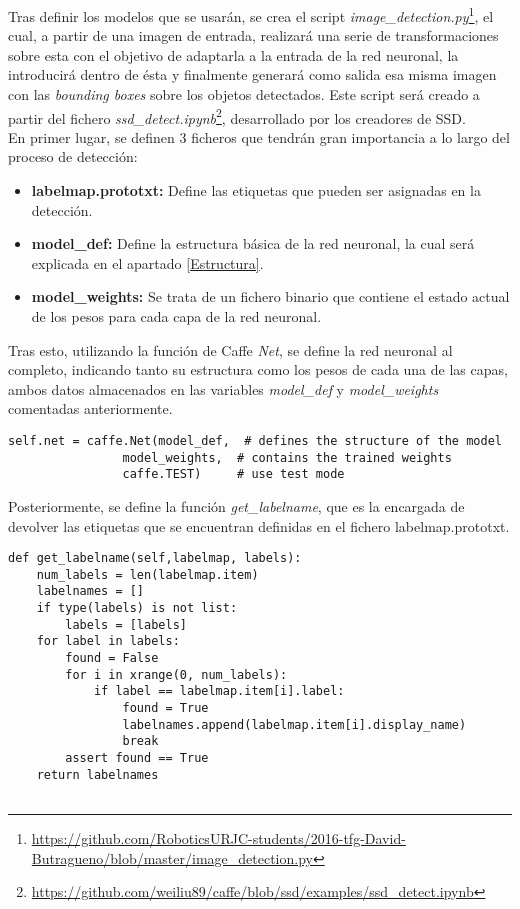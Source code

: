 \documentclass[a4paper, 12pt, spanish, chapterprefix, numbers=noenddot]{book}
\begin{document}
Tras definir los modelos que se usarán, se crea el script \textit{image\_detection.py}\footnote{\url{https://github.com/RoboticsURJC-students/2016-tfg-David-Butragueno/blob/master/image_detection.py}}, el cual, a partir de una imagen de entrada, realizará una serie de transformaciones sobre esta con el objetivo de adaptarla a la entrada de la red neuronal, la introducirá dentro de ésta y finalmente generará como salida esa misma imagen con las \textit{bounding boxes} sobre los objetos detectados. Este script será creado a partir del fichero \textit{ssd\_detect.ipynb}\footnote{\url{https://github.com/weiliu89/caffe/blob/ssd/examples/ssd_detect.ipynb}}, desarrollado por los creadores de SSD.\\

En primer lugar, se definen 3 ficheros que tendrán gran importancia a lo largo del proceso de detección:

\begin{itemize}
\item \textbf{labelmap.prototxt:} Define las etiquetas que pueden ser asignadas en la detección.
\item \textbf{model\_def:} Define la estructura básica de la red neuronal, la cual será explicada en el apartado \ref{Estructura}.
\item \textbf{model\_weights:} Se trata de un fichero binario que contiene el estado actual de los pesos para cada capa de la red neuronal.
\end{itemize}

Tras esto, utilizando la función de Caffe \textit{Net}, se define la red neuronal al completo, indicando tanto su estructura como los pesos de cada una de las capas, ambos datos almacenados en las variables \textit{model\_def} y \textit{model\_weights} comentadas anteriormente.\\

\begin{lstlisting}[frame=single]
self.net = caffe.Net(model_def,  # defines the structure of the model
				model_weights,  # contains the trained weights
				caffe.TEST)     # use test mode
\end{lstlisting}

Posteriormente, se define la función \textit{get\_labelname}, que es la encargada de devolver las etiquetas que se encuentran definidas en el fichero {labelmap.prototxt}.\\

\begin{lstlisting}[frame=single]
def get_labelname(self,labelmap, labels):
    num_labels = len(labelmap.item)
    labelnames = []
    if type(labels) is not list:
        labels = [labels]
    for label in labels:
        found = False
        for i in xrange(0, num_labels):
            if label == labelmap.item[i].label:
                found = True
                labelnames.append(labelmap.item[i].display_name)
                break
        assert found == True
    return labelnames
    
\end{lstlisting}
\end{document}
